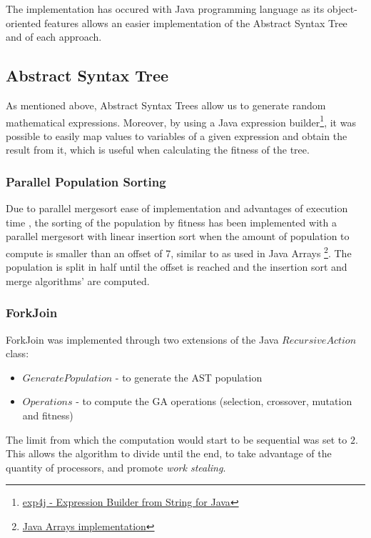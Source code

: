 \documentclass[runningheads]{llncs}
\begin{document}
The implementation has occured with Java programming language as its object-oriented features allows an easier implementation of the Abstract Syntax Tree and of each approach.

\subsection{Abstract Syntax Tree}

As mentioned above, Abstract Syntax Trees allow us to generate random mathematical expressions. Moreover, by using a Java expression builder\footnote{\href{https://www.objecthunter.net/exp4j/index.htm}{exp4j - Expression Builder from String for Java}}, it was possible to easily map values to variables of a given expression and obtain the result from it, which is useful when calculating the fitness of the tree.

\subsubsection{Parallel Population Sorting} \label{subsubsec:parallelSort} \hfill \par
Due to parallel mergesort ease of implementation and advantages of execution time \cite{analysisMergeSort}, the sorting of the population by fitness has been implemented with a parallel mergesort with linear insertion sort when the amount of population to compute is smaller than an offset of 7, similar to as used in Java Arrays \footnote{\href{http://www.docjar.com/html/api/java/util/Arrays.java.html}{Java Arrays implementation}}.
The population is split in half until the offset is reached and the insertion sort and merge algorithms' are computed.

\subsubsection{ForkJoin} \hfill \par
ForkJoin was implemented through two extensions of the Java \(RecursiveAction\) class:

\begin{itemize}
\item $GeneratePopulation$ - to generate the AST population
\item $Operations$ - to compute the GA operations (selection, crossover, mutation and fitness)
\end{itemize}

The limit from which the computation would start to be sequential was set to $2$. This allows the algorithm to divide until the end, to take advantage of the quantity of processors, and promote \textit{work stealing}.
\end{document}
